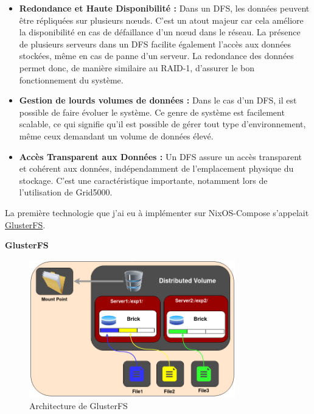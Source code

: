 \documentclass[a4paper,french,12pt, titlepage]{article}
\begin{document}
\begin{itemize}
\item
  \textbf{Redondance et Haute Disponibilité :} Dans un DFS, les données
  peuvent être répliquées sur plusieurs nœuds. C'est un atout majeur car
  cela améliore la disponibilité en cas de défaillance d'un nœud dans le
  réseau. La présence de plusieurs serveurs dans un DFS facilite
  également l'accès aux données stockées, même en cas de panne d'un
  serveur. La redondance des données permet donc, de manière similaire
  au RAID-1, d'assurer le bon fonctionnement du système.
\item
  \textbf{Gestion de lourds volumes de données :} Dans le cas d'un DFS,
  il est possible de faire évoluer le système. Ce genre de système est
  facilement scalable, ce qui signifie qu'il est possible de gérer tout
  type d'environnement, même ceux demandant un volume de données élevé.
\item
  \textbf{Accès Transparent aux Données :} Un DFS assure un accès
  transparent et cohérent aux données, indépendamment de l'emplacement
  physique du stockage. C'est une caractéristique importante, notamment
  lors de l'utilisation de Grid5000.\newline
\end{itemize}

La première technologie que j'ai eu à implémenter sur NixOS-Compose
s'appelait \href{https://www.gluster.org/}{GlusterFS}.\newline

\textbf{GlusterFS}

\begin{figure}[h]
\centering
\includegraphics[width=0.8\textwidth,height=0.8\textheight,keepaspectratio]{images/shema-gluster.png}
\caption{Architecture de GlusterFS}
\end{figure}
\end{document}
